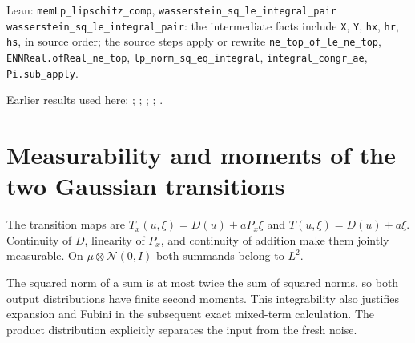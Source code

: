 \documentclass[11pt,a4paper]{article}
\begin{document}
\begin{leanbox}{Lean: \texttt{memLp\_\allowbreak{}lipschitz\_\allowbreak{}comp}, \texttt{wasserstein\_\allowbreak{}sq\_\allowbreak{}le\_\allowbreak{}integral\_\allowbreak{}pair}}
\texttt{wasserstein\_\allowbreak{}sq\_\allowbreak{}le\_\allowbreak{}integral\_\allowbreak{}pair}: the intermediate facts include \texttt{X}, \texttt{Y}, \texttt{hx}, \texttt{hr}, \texttt{hs}, in source order; the source steps apply or rewrite \texttt{ne\_\allowbreak{}top\_\allowbreak{}of\_\allowbreak{}le\_\allowbreak{}ne\_\allowbreak{}top}, \texttt{ENNReal.\allowbreak{}of\allowbreak{}Real\_\allowbreak{}ne\_\allowbreak{}top}, \texttt{lp\_\allowbreak{}norm\_\allowbreak{}sq\_\allowbreak{}eq\_\allowbreak{}integral}, \texttt{integral\_\allowbreak{}congr\_\allowbreak{}ae}, \texttt{Pi.\allowbreak{}sub\_\allowbreak{}apply}.
\end{leanbox}


Earlier results used here: \cite[Section~3.13.1]{LangevinLean2026ULASC}; \cite[Section~3.17.12]{LangevinLean2026ULASC}; \cite[Section~3.17.13]{LangevinLean2026ULASC}; \cite[Section~3.17.3]{LangevinLean2026ULASC}; \cite[Section~3.17.4]{LangevinLean2026ULASC}.

\section{\texorpdfstring{Measurability and moments of the two Gaussian transitions}{Measurability and moments of the two Gaussian transitions}}


The transition maps are \(T_x(u,\xi)=D(u)+aP_x\xi\) and \(T(u,\xi)=D(u)+a\xi\). Continuity of \(D\), linearity of \(P_x\), and continuity of addition make them jointly measurable. On \(\mu\otimes\mathcal N(0,I)\) both summands belong to \(L^2\).



The squared norm of a sum is at most twice the sum of squared norms, so both output distributions have finite second moments. This integrability also justifies expansion and Fubini in the subsequent exact mixed-term calculation. The product distribution explicitly separates the input from the fresh noise.
\end{document}
